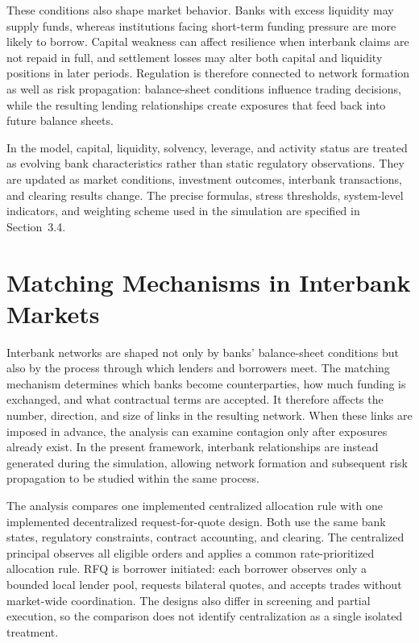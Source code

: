 These conditions also shape market behavior. Banks with excess liquidity
may supply funds, whereas institutions facing short-term funding
pressure are more likely to borrow. Capital weakness can affect
resilience when interbank claims are not repaid in full, and settlement
losses may alter both capital and liquidity positions in later periods.
Regulation is therefore connected to network formation as well as risk
propagation: balance-sheet conditions influence trading decisions, while
the resulting lending relationships create exposures that feed back into
future balance sheets.

In the model, capital, liquidity, solvency, leverage, and activity status
are treated as evolving bank characteristics rather than static
regulatory observations. They are updated as market conditions,
investment outcomes, interbank transactions, and clearing results
change. The precise formulas, stress thresholds, system-level
indicators, and weighting scheme used in the simulation are specified in
Section~3.4.

\section{Matching Mechanisms in Interbank Markets}

Interbank networks are shaped not only by banks' balance-sheet
conditions but also by the process through which lenders and borrowers
meet. The matching mechanism determines which banks become
counterparties, how much funding is exchanged, and what contractual
terms are accepted. It therefore affects the number, direction, and size
of links in the resulting network. When these links are imposed in
advance, the analysis can examine contagion only after exposures already
exist. In the present framework, interbank relationships are instead
generated during the simulation, allowing network formation and
subsequent risk propagation to be studied within the same process.

The analysis compares one implemented centralized allocation rule with
one implemented decentralized request-for-quote design. Both use the same
bank states, regulatory constraints, contract accounting, and clearing.
The centralized principal observes all eligible orders and applies a
common rate-prioritized allocation rule. RFQ is borrower initiated: each
borrower observes only a bounded local lender pool, requests bilateral
quotes, and accepts trades without market-wide coordination. The designs
also differ in screening and partial execution, so the comparison does not
identify centralization as a single isolated treatment.

